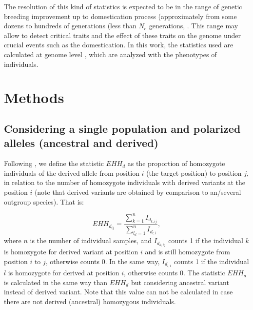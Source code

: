 \documentclass[a4paper,11pt]{article}
\begin{document}

The resolution of this kind of statistics is expected to be in the range of genetic breeding improvement up to domestication process (approximately from some dozens to hundreds of generations (less than $N_e$ generations, \citep{Sabeti:2002aa}. This range may allow to detect critical traits and the effect of these traits on the genome under crucial events such as the domestication. In this work, the statistics used are calculated at genome level %
, which are analyzed with the phenotypes of individuals.

\section{Methods}
\subsection{Considering a single population and polarized alleles (ancestral and derived)}
Following \citet{Sabeti:2002aa}, we define the statistic $EHH_d$ as the proportion of homozygote individuals of the derived allele from position $i$ (the target position) to position $j$, in relation to the number of homozygote individuals with derived variants at the position $i$ (note that derived variants are obtained by comparison to an/several outgroup species).  That is:

 \begin{equation}
 EHH_{d_{ij}} = \frac{\sum_{k=1}^{n}I_{d_{k,ij}}}{\sum_{l_d=1}^{n}I_{d_{l,i}}},
 \end{equation}
where $n$ is the number of individual samples, and $I_{d_{k,ij}}$ counts 1 if the individual $k$ is homozygote for derived variant at position $i$ and is still homozygote from position $i$ to $j$, otherwise counts 0. In the same way, $I_{d_{l,i}}$ counts 1 if the individual $l$ is homozygote for derived at position $i$, otherwise counts 0. The statistic $EHH_a$ is calculated in the same way than $EHH_d$ but considering ancestral variant instead of derived variant.  %
Note that this value can not be calculated in case there are not derived (ancestral) homozygous individuals.
\end{document}
